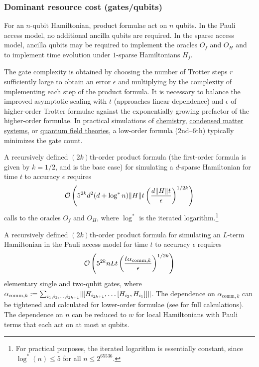 \begin{refsection}

\subsubsection*{Dominant resource cost (gates/qubits)}
For an $n$-qubit Hamiltonian, product formulae act on $n$ qubits. In the Pauli access model, no additional ancilla qubits are required. In the sparse access model, ancilla qubits may be required to implement the oracles $O_f$ and $O_H$ and to implement time evolution under $1$-sparse Hamiltonians $H_j$.

The gate complexity is obtained by choosing the number of Trotter steps $r$ sufficiently large to obtain an error $\epsilon$ and multiplying by the complexity of implementing each step of the product formula. It is necessary to balance the improved asymptotic scaling with $t$ (approaches linear dependence) and $\epsilon$ of higher-order Trotter formulae against the exponentially growing prefactor of the higher-order formulae. In practical simulations of \hyperref[appl:QuantumChemistry]{chemistry}, \hyperref[appl:CondensedMatter]{condensed matter systems}, or \hyperref[appl:QuantumFieldTheories]{quantum field theories}, a low-order formula (2nd--6th) typically minimizes the gate count.  

A recursively defined $(2k)$th-order product formula (the first-order formula is given by $k=1/2$, and is the base case) for simulating a $d$-sparse Hamiltonian for time $t$ to accuracy $\epsilon$ requires~\cite{childs2010StarHamiltonianSimulation}
\begin{equation}
    \mathcal{O}\left(  5^{2k} d^2 (d + \log^*n) \lVert H\rVert t \left(\frac{d \lVert H\rVert t}{\epsilon} \right)^{1/2k}  \right)
\end{equation}
calls to the oracles $O_f$ and $O_H$, where $\log^*$ is the iterated logarithm.\footnote{For practical purposes, the iterated logarithm is essentially constant, since $\log^*(n) \leq 5$ for all $n \leq 2^{65536}$.}

A recursively defined $(2k)$th-order product formula for simulating an $L$-term Hamiltonian in the Pauli access model for time $t$ to accuracy $\epsilon$ requires~\cite{childs2021TheoryTrotter}
\begin{equation}
    \mathcal{O}\left(  5^{2k} nLt\left(\frac{t \alpha_{\mathrm{comm},k}}{\epsilon} \right)^{1/2k}  \right)
\end{equation}
elementary single and two-qubit gates, where $\alpha_{\mathrm{comm},k} := \sum_{i_1, i_2,\ldots, i_{2k+1}} \lVert[H_{i_{2k+1}},\ldots [H_{i_2}, H_{i_1}]]\rVert$. The dependence on $\alpha_{\mathrm{comm},k}$ can be tightened and calculated for lower-order formulae (see \cite{childs2021TheoryTrotter} for full calculations). The dependence on $n$ can be reduced to $w$ for local Hamiltonians with Pauli terms that each act on at most $w$ qubits.




\end{refsection}
